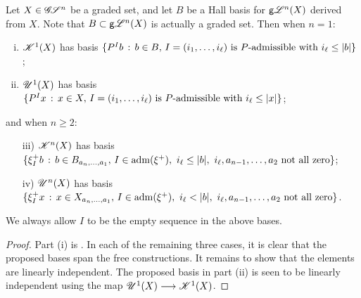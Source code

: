 \documentclass[11pt]{article}
\newcommand{\GoodLie}[1]{\mathsf{g}{\scrL}^{#1}}%
\newcommand{\LL}[1]{{\scrK}^{#1}}%
\newcommand{\GS}[1]{\scrG\!\scrS^{#1}}
\newcommand{\nontop}[1]{\scrU^{#1}}%
\newcommand{\admis}[1]{\mathrm{adm}(#1)}%
\newcommand{\Fr}[1]{#1}%
\newcommand{\LambdaOp}{\xi^{+}}
\begin{document}
\begin{CategoriesOfInterest}
\begin{prop*}
Let $X\in\GS{n}$ be a graded set, and let $B$ be a Hall basis for $\Fr{\GoodLie{n}}(X)$ derived from $X$. Note that $B\subset \Fr{\GoodLie{n}}(X)$ is actually a graded set. Then when $n=1$:
\begin{enumerate}[i)]\squishlist
\setlength{\parindent}{.25in}
\item $\Fr{\LL{1}}(X)$ has basis $\{P^Ib\,:\,b\in B,\,I=(i_1,\ldots,i_\ell)\textup{ is $P$-admissible with }i_\ell\leq|b| \}$;
\item $\Fr{\nontop{1}}(X)$ has basis $\{P^Ix\,:\,x\in X,\,I=(i_1,\ldots,i_\ell)\textup{ is $P$-admissible with }i_\ell\leq|x| \}$;
\end{enumerate}
and when $n\geq2$:
\begin{enumerate}[i)]\squishlist
\setlength{\parindent}{.25in}
\item[iii)] $\Fr{\LL{n}}(X)$ has basis $\{\LambdaOp_Ib\,:\,b\in B_{a_{n},\ldots,a_1},\,I\in\admis{\LambdaOp},\ i_\ell\leq|b|,\ i_\ell,a_{n-1},\ldots,a_2\textup{ not all zero}\}$;
\item[iv)] $\Fr{\nontop{n}}(X)$ has basis $\{\LambdaOp_Ix\,:\,x\in X_{a_{n},\ldots,a_1},\,I\in\admis{\LambdaOp},\ i_\ell<|b|,\ i_\ell,a_{n-1},\ldots,a_2\textup{ not all zero}\}$.
\end{enumerate}
We always allow $I$ to be the empty sequence in the above bases.
\end{prop*}
%
\begin{proof}
Part (i) is \cite[Thm F, p.15]{MR1089001}.
In each of the remaining three cases, it is clear that the proposed bases span the free constructions. It remains to show that the elements are linearly independent.
The proposed basis in part (ii) is seen to be linearly independent using the map $\Fr{\nontop{1}}(X)\to \Fr{\LL{1}}(X)$.


\end{proof}
\end{CategoriesOfInterest}
\end{document}
